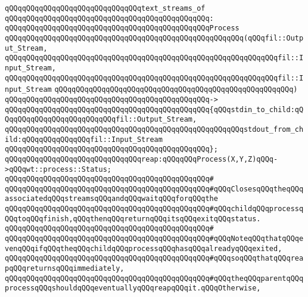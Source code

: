 \newline
\verb|qQQqqQQqqQQqqQQqqQQqqQQqqQQqqQQqtext_streams_of|\newline
\verb|qQQqqQQqqQQqqQQqqQQqqQQqqQQqqQQqqQQqqQQqqQQqqQQq:|\newline
\verb|qQQqqQQqqQQqqQQqqQQqqQQqqQQqqQQqqQQqqQQqqQQqqQQqProcess|\newline
\verb|qQQqqQQqqQQqqQQqqQQqqQQqqQQqqQQqqQQqqQQqqQQqqQQqqQQqqQQq(qQQqfil::Output_Stream,|\newline
\verb|qQQqqQQqqQQqqQQqqQQqqQQqqQQqqQQqqQQqqQQqqQQqqQQqqQQqqQQqqQQqqQQqfil::Input_Stream,|\newline
\verb|qQQqqQQqqQQqqQQqqQQqqQQqqQQqqQQqqQQqqQQqqQQqqQQqqQQqqQQqqQQqqQQqfil::Input_Stream|\newline
\verb|qQQqqQQqqQQqqQQqqQQqqQQqqQQqqQQqqQQqqQQqqQQqqQQqqQQqqQQq)|\newline
\verb|qQQqqQQqqQQqqQQqqQQqqQQqqQQqqQQqqQQqqQQqqQQqqQQq->|\newline
\verb|qQQqqQQqqQQqqQQqqQQqqQQqqQQqqQQqqQQqqQQqqQQqqQQq{qQQqstdin_to_child:qQQqqQQqqQQqqQQqqQQqqQQqqQQqfil::Output_Stream,|\newline
\verb|qQQqqQQqqQQqqQQqqQQqqQQqqQQqqQQqqQQqqQQqqQQqqQQqqQQqqQQqstdout_from_child:qQQqqQQqqQQqqQQqfil::Input_Stream|\newline
\verb|qQQqqQQqqQQqqQQqqQQqqQQqqQQqqQQqqQQqqQQqqQQqqQQq};|\newline
\newline
\verb|qQQqqQQqqQQqqQQqqQQqqQQqqQQqqQQqreap:qQQqqQQqProcess(X,Y,Z)qQQq->qQQqwt::process::Status;|\newline
\verb|qQQqqQQqqQQqqQQqqQQqqQQqqQQqqQQqqQQqqQQqqQQqqQQq#|\newline
\verb|qQQqqQQqqQQqqQQqqQQqqQQqqQQqqQQqqQQqqQQqqQQqqQQq#qQQqClosesqQQqtheqQQqassociatedqQQqstreamsqQQqandqQQqwaitqQQqforqQQqthe|\newline
\verb|qQQqqQQqqQQqqQQqqQQqqQQqqQQqqQQqqQQqqQQqqQQqqQQq#qQQqchildqQQqprocessqQQqtoqQQqfinish,qQQqthenqQQqreturnqQQqitsqQQqexitqQQqstatus.|\newline
\verb|qQQqqQQqqQQqqQQqqQQqqQQqqQQqqQQqqQQqqQQqqQQqqQQq#|\newline
\verb|qQQqqQQqqQQqqQQqqQQqqQQqqQQqqQQqqQQqqQQqqQQqqQQq#qQQqNoteqQQqthatqQQqevenqQQqifqQQqtheqQQqchildqQQqprocessqQQqhasqQQqalreadyqQQqexited,|\newline
\verb|qQQqqQQqqQQqqQQqqQQqqQQqqQQqqQQqqQQqqQQqqQQqqQQq#qQQqsoqQQqthatqQQqreapqQQqreturnsqQQqimmediately,|\newline
\verb|qQQqqQQqqQQqqQQqqQQqqQQqqQQqqQQqqQQqqQQqqQQqqQQq#qQQqtheqQQqparentqQQqprocessqQQqshouldqQQqeventuallyqQQqreapqQQqit.qQQqOtherwise,|\newline
